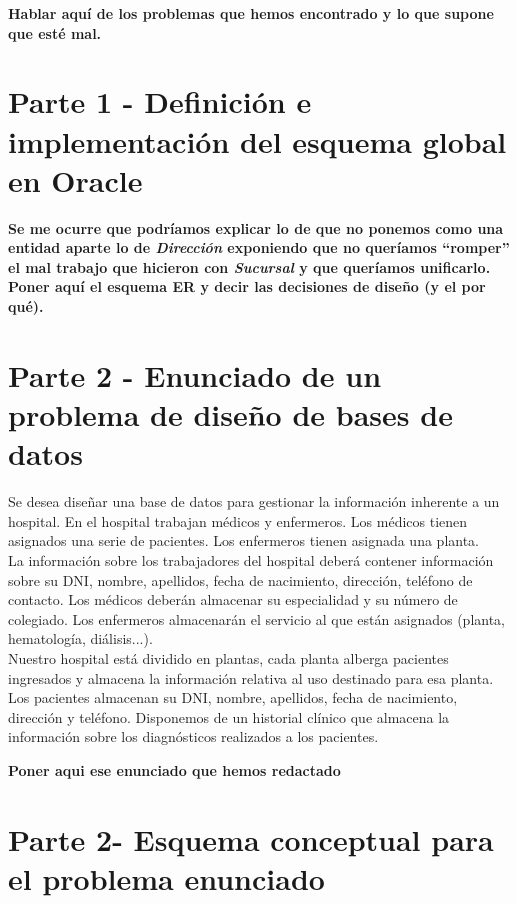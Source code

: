 \documentclass{article}
\begin{document}
\textbf{Hablar aquí de los problemas que hemos encontrado y lo que supone que esté mal.}

\section{Parte 1 - Definición e implementación del esquema global en Oracle}

\textbf{Se me ocurre que podríamos explicar lo de que no ponemos como una entidad aparte lo de \emph{Dirección} exponiendo que no queríamos ``romper'' el mal trabajo que hicieron con \emph{Sucursal} y que queríamos unificarlo.}
\textbf{Poner aquí el esquema ER y decir las decisiones de diseño (y el por qué).}

\section{Parte 2 - Enunciado de un problema de diseño de bases de datos}

Se desea diseñar una base de datos para gestionar la información inherente a un hospital. En el hospital trabajan médicos y enfermeros. Los médicos tienen asignados una serie de pacientes. Los enfermeros tienen asignada una planta.\\
La información sobre los trabajadores del hospital deberá contener información sobre su DNI, nombre, apellidos, fecha de nacimiento, dirección, teléfono de contacto. Los médicos deberán almacenar su especialidad y su número de colegiado. Los enfermeros almacenarán el servicio al que están asignados (planta, hematología, diálisis...).\\
Nuestro hospital está dividido en plantas, cada planta alberga pacientes ingresados y almacena la información relativa al uso destinado para esa planta.\\
Los pacientes almacenan su DNI, nombre, apellidos, fecha de nacimiento, dirección y teléfono. Disponemos de un historial clínico que almacena la información sobre los diagnósticos realizados a los pacientes.

\textbf{Poner aqui ese enunciado que hemos redactado}

\section{Parte 2- Esquema conceptual para el problema enunciado}
\end{document}
